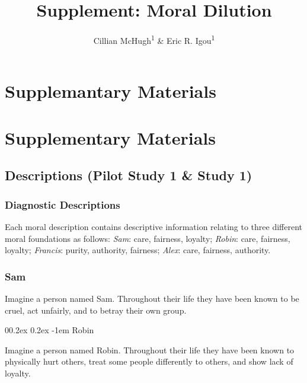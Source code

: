 \documentclass[
  american,
  man,floatsintext]{apa7}
\title{Supplement: Moral Dilution}
\author{Cillian McHugh\textsuperscript{1} \& Eric R. Igou\textsuperscript{1}}
\date{}
\affiliation{\vspace{0.5cm}\textsuperscript{1} University of Limerick}
\makeatletter
\let\oldparagraph\paragraph
\renewcommand{\paragraph}[1]{\oldparagraph{#1}\mbox{}}
\renewcommand{\paragraph}{\@startsection{paragraph}{4}{\parindent}%
  {0\baselineskip \@plus 0.2ex \@minus 0.2ex}%
  {-1em}%
  {\normalfont\normalsize\bfseries\itshape\typesectitle}}
\makeatother
\begin{document}
\maketitle

\hypertarget{supplemantary-materials}{%
\section{Supplemantary Materials}\label{supplemantary-materials}}

\newpage

\hypertarget{supplementary-materials}{%
\section{Supplementary Materials}\label{supplementary-materials}}

\hypertarget{descriptions-pilot-study-1-study-1}{%
\subsection{Descriptions (Pilot Study 1 \& Study 1)}\label{descriptions-pilot-study-1-study-1}}

\hypertarget{diagnostic-descriptions}{%
\subsubsection{Diagnostic Descriptions}\label{diagnostic-descriptions}}

Each moral description contains descriptive information relating to three different moral foundations as follows: \emph{Sam}: care, fairness, loyalty; \emph{Robin}: care, fairness, loyalty; \emph{Francis}: purity, authority, fairness; \emph{Alex}: care, fairness, authority.

\hypertarget{sam}{%
\subsubsection{Sam}\label{sam}}

Imagine a person named Sam.
Throughout their life they have been known to be cruel, act unfairly, and to betray their own group.

\hypertarget{robin}{%
\paragraph{Robin}\label{robin}}

Imagine a person named Robin.
Throughout their life they have been known to physically hurt others, treat some people differently to others, and show lack of loyalty.
\end{document}

